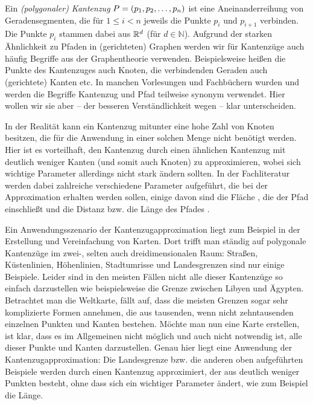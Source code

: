 	Ein \emph{(polygonaler) Kantenzug} $P = (p_1, p_2, \mathellipsis, p_n)$ ist eine Aneinanderreihung von Geradensegmenten, die für $1 \leq i < n$ jeweils die Punkte $p_i$ und $p_{i+1}$ verbinden. 
	Die Punkte $p_i$ stammen dabei aus $\mathbb{R}^d$ (für $d \in \mathbb{N}$). Aufgrund der starken Ähnlichkeit zu Pfaden in (gerichteten) Graphen werden wir für Kantenzüge auch häufig Begriffe aus der Graphentheorie verwenden. 
	Beispielsweise heißen die Punkte des Kantenzuges auch Knoten, die verbindenden Geraden auch (gerichtete) Kanten etc.
	In manchen Vorlesungen und Fachbüchern wurden und werden die Begriffe Kantenzug und Pfad teilweise synonym verwendet.
	Hier wollen wir sie aber -- der besseren Verständlichkeit wegen --  klar unterscheiden.

    In der Realität kann ein Kantenzug mitunter eine hohe Zahl von Knoten besitzen, die für die Anwendung in einer solchen Menge nicht benötigt werden. 
    Hier ist es vorteilhaft, den Kantenzug durch einen ähnlichen Kantenzug mit deutlich weniger Kanten (und somit auch Knoten) zu approximieren, wobei sich wichtige Parameter allerdings nicht stark ändern sollten. 
    In der Fachliteratur werden dabei zahlreiche verschiedene Parameter aufgeführt, die bei der Approximation erhalten werden sollen, einige davon sind die Fläche \cite{bose}, die der Pfad einschließt und die Distanz bzw. die Länge des Pfades \cite{gudmundsson}. 
    
    Ein Anwendungsszenario der Kantenzugapproximation liegt zum Beispiel in der Erstellung und Vereinfachung von Karten. 
    Dort trifft man ständig auf polygonale Kantenzüge im \mbox{zwei-,} selten auch dreidimensionalen Raum: Straßen, Küstenlinien, Höhenlinien, Stadtumrisse und Landesgrenzen sind nur einige Beispiele. 
    Leider sind in den meisten Fällen nicht alle dieser Kantenzüge so einfach darzustellen wie beispielsweise die Grenze zwischen Libyen und Ägypten. 
    Betrachtet man die Weltkarte, fällt auf, dass die meisten Grenzen sogar sehr komplizierte Formen annehmen, die aus tausenden, wenn nicht zehntausenden einzelnen Punkten und Kanten bestehen.
    Möchte man nun eine Karte erstellen, ist klar, dass es im Allgemeinen nicht möglich und auch nicht notwendig ist, alle dieser Punkte und Kanten darzustellen. 
    Genau hier liegt eine Anwendung der Kantenzugapproximation: Die Landesgrenze bzw. die anderen oben aufgeführten Beispiele werden durch einen Kantenzug approximiert, der aus deutlich weniger Punkten besteht, ohne dass sich ein wichtiger Parameter ändert, wie zum Beispiel die Länge.
    
